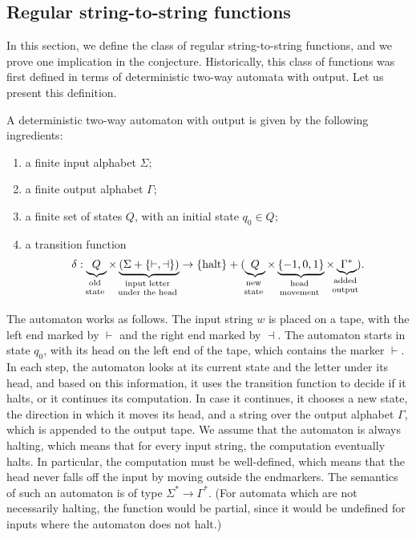 
\subsection{Regular string-to-string functions}
\label{sec:regular-string-to-string-functions}

In this section, we define the class of regular string-to-string functions, and we prove one implication in the conjecture. 
 Historically, this class of functions was first defined in terms of 
 deterministic two-way automata with output\cite[Note 4]{shepherdson1959reduction}. Let us present this definition.

 \begin{definition}
    A deterministic two-way automaton with output is given by the following ingredients:
    \begin{enumerate}
        \item a finite input alphabet $\Sigma$;
        \item a finite output alphabet $\Gamma$;
        \item a finite set of states $Q$, with an initial state $q_0 \in Q$;
        \item a transition function  
        \begin{align*}
        \delta : 
        \myunderbrace{Q}{old \\ state} \times 
        \myunderbrace{(\Sigma + \{\vdash, \dashv\})}{input letter\\ under  the head} \to  \set{\text{halt}} + (
        \myunderbrace{Q}{new \\ state}
         \times 
         \myunderbrace{\{-1,0,1\}}{head \\ movement} \times 
         \myunderbrace{\Gamma^*}{added \\ output}) .
        \end{align*}
    \end{enumerate}
 \end{definition}

    The automaton works as follows. The input string $w$ is placed on a tape, with the left end marked by $\vdash$ and the right end marked by $\dashv$. The automaton starts in state $q_0$, with its head on the left end of the tape, which contains the marker $\vdash$. In each step, the automaton looks at its current state and the letter under its head, and based on this information, it uses the transition function to decide if it halts, or it continues its computation. In case it continues, it chooses a  new state, the direction in which it moves its head, and a string over the output alphabet $\Gamma$, which is appended to the output tape. We assume that the automaton is always halting, which means that for every input string, the computation eventually halts. In particular, the computation must be well-defined, which means that the head never falls off the input by moving outside the endmarkers.   The semantics of such an automaton is of type $\Sigma^* \to \Gamma^*$. (For automata which are not necessarily halting, the function would be partial, since it would be undefined for inputs where the automaton does not halt.)

